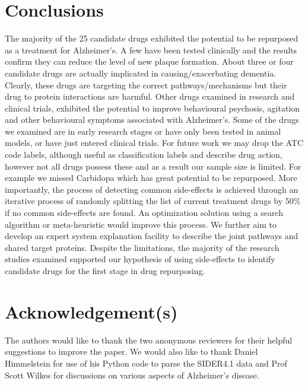 \documentclass[preprint,12pt]{elsarticle}
\begin{document}
\section{Conclusions}
The majority of the 25 candidate drugs exhibited the potential to be repurposed as a treatment for Alzheimer's. A few have been tested clinically and the results confirm they can reduce the level of new plaque formation. About three or four candidate drugs are actually implicated in causing/exacerbating dementia. Clearly, these drugs are targeting the correct pathways/mechanisms but  their drug to protein interactions are harmful. Other drugs examined in research and clinical trials, exhibited the potential to improve behavioural psychosis, agitation and other behavioural symptoms associated with Alzheimer's.   Some of the drugs we examined are in early research stages or have only been tested in animal models, or have just entered clinical trials. For future work we may drop the ATC code labels, although useful as classification labels and describe drug action, however not all drugs possess these and as a result our sample size is limited. For example we missed  Carbidopa which has great potential to be repurposed. More importantly, the process of detecting common side-effects is achieved through an iterative process of randomly splitting the list of current treatment drugs by 50\% if no common side-effects are found. An optimization solution using a search algorithm or meta-heuristic would improve this process. We further aim to develop an expert system explanation facility to describe the joint pathways and shared target proteins. Despite the limitations, the majority of the research studies examined supported our hypothesis of using side-effects to identify candidate drugs for the first stage in drug repurposing. 

\section*{Acknowledgement(s)}
The authors would like to thank the two anonymous reviewers for their helpful suggestions to improve the paper. We would also like to thank Daniel Himmelstein for use of his Python code to parse the SIDER4.1 data and Prof Scott Wilkes for discussions on various aspects of Alzheimer's disease.



\end{document}

